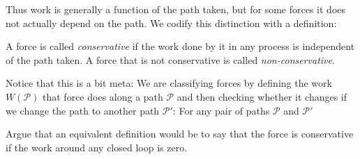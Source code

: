 Thus work is generally a function of the path taken, but for some forces it does not actually depend on the path. 
We codify this distinction with a definition:
\begin{definition}
A force is called {\em conservative} if the work done by it in any process is independent of the path taken.
A force that is not conservative is called {\em non-conservative}.
\end{definition}
Notice that this is a bit meta: We are classifying forces by defining the work $W({\mathscr P})$ that force does along a path ${\mathscr P}$ and then checking whether it changes if we change the path to another path ${\mathscr P}'$: For any pair of paths ${\mathscr P}$ and ${\mathscr P}'$

\begin{exercise} 
Argue that an equivalent definition would be to say that the force is conservative if the work around any closed loop is zero.
\end{exercise}

